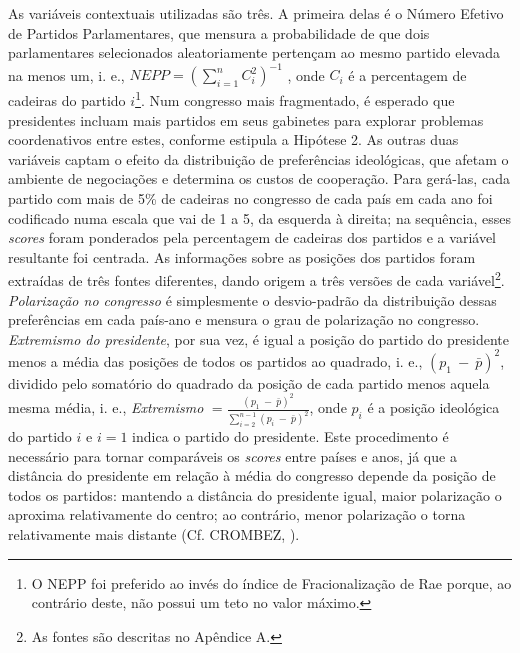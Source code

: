 As variáveis contextuais utilizadas são três. A primeira delas é o Número Efetivo de Partidos Parlamentares, que mensura a probabilidade de que dois parlamentares selecionados aleatoriamente pertençam ao mesmo partido elevada na menos um, i. e., $NEPP = (\sum_{i=1}^{n} C_{i}^2)^{-1}$ , onde $C_{i}$ é a percentagem de cadeiras do partido $i$\footnote{O NEPP foi preferido ao invés do índice de Fracionalização de Rae porque, ao contrário deste, não possui um teto no valor máximo.}. Num congresso mais fragmentado, é esperado que presidentes incluam mais partidos em seus gabinetes para explorar problemas coordenativos entre estes, conforme estipula a Hipótese 2. As outras duas variáveis captam o efeito da distribuição de preferências ideológicas, que afetam o ambiente de negociações e determina os custos de cooperação. Para gerá-las, cada partido com mais de 5\% de cadeiras no congresso de cada país em cada ano foi codificado numa escala que vai de 1 a 5, da esquerda à direita; na sequência, esses \textit{scores} foram ponderados pela percentagem de cadeiras dos partidos e a variável resultante foi centrada. As informações sobre as posições dos partidos foram extraídas de três fontes diferentes, dando origem a três versões de cada variável\footnote{As fontes são descritas no Apêndice A.}. \textit{Polarização no congresso} é simplesmente o desvio-padrão da distribuição dessas preferências em cada país-ano e mensura o grau de polarização no congresso. \textit{Extremismo do presidente}, por sua vez, é igual a posição do partido do presidente menos a média das posições de todos os partidos ao quadrado, i. e., $(p_{1}~ -~\bar{p})^2$, dividido pelo somatório do quadrado da posição de cada partido menos aquela mesma média, i. e., \textit{Extremismo} $= \frac{(p_{1}~ -~\bar{p})^2}{\sum_{i=2}^{n-1} (p_{i} ~ - ~ \bar{p})^2}$, onde $p_{i}$ é a posição ideológica do partido $i$ e $i = 1$ indica o partido do presidente. Este procedimento é necessário para tornar comparáveis os \textit{scores} entre países e anos, já que a distância do presidente em relação à média do congresso depende da posição de todos os partidos: mantendo a distância do presidente igual, maior polarização o aproxima relativamente do centro; ao contrário, menor polarização o torna relativamente mais distante (Cf. CROMBEZ, \citeyear{crombez1996}).
 
